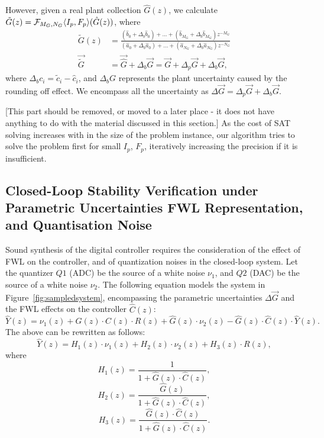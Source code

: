 \documentclass[final]{sig-alternate-05-2015}
\newcommand{\red}[1]{{\color{red}#1}}
\begin{document}
However, given a real plant collection $\hat{G}(z)$,
%
we calculate $\tilde G(z)=\mathcal{F}_{M_G,N_G}\langle{I_p},{F_p}\rangle(\hat{G}(z))$, where 
%
\begin{align}
\label{digital_plant_tf}
\tilde G(z)&=\frac{(\hat{b}_{0}+\Delta_b \hat{b}_{0}) +...+(\hat{b}_{M_G}+\Delta_b \hat{b}_{M_G})z^{-M_G}}{(\hat{a}_{0}+\Delta_b \hat{a}_{0})+...+(\hat{a}_{N_G}+\Delta_b \hat{a}_{N_G})z^{-N_G}} \nonumber \\
\vec{\tilde G} &=\vec{\hat{G}}+\Delta_b{\vec{G}}=\vec{G}+\Delta_p{\vec{G}}+\Delta_b{\vec{G}}, 
\end{align}
%
where $\Delta_bc_i=\tilde{c}_i-\hat{c}_i$, 
and $\Delta_b{G}$ represents the plant uncertainty caused by
the rounding off effect.  We encompass all the uncertainty as
$\Delta{\vec{G}}=\Delta_p{\vec{G}}+\Delta_b{\vec{G}}$. 

\red{[This part should be removed, or moved to a later place - it does not have anything to do with the material discussed in this section.]
As the cost of SAT solving increases with in the size of the problem
instance, our algorithm tries to solve the problem first for small $I_p$,
$F_p$, iteratively increasing the precision if it is insufficient.
}

\subsection{Closed-Loop Stability Verification under Parametric Uncertainties FWL Representation, and Quantisation Noise}
\label{sec:stability}

Sound synthesis of the digital controller requires the consideration of the effect of FWL on the controller, 
and of quantization noises in the closed-loop system.  
Let the quantizer $Q1$ (ADC) be the source of a white noise $\nu_{1}$, 
and $Q2$ (DAC) be the source of a white noise $\nu_{2}$.  The following equation
models the system in Figure~\ref{fig:sampledsystem}, encompassing the
parametric uncertainties $\Delta \vec{G}$ and the FWL effects on
the controller $\hat{C}(z)$:
%
\begin{equation}
\hat{Y}(z)=\nu_{1}(z)+\hat{G}(z)\cdot C(z)\cdot R(z)+\hat{G}(z)\cdot\nu_{2}(z)-\hat{G}(z)\cdot \hat{C}(z)\cdot \hat{Y}(z). 
\end{equation}
%
The above can be rewritten as follows:
%
\begin{equation}
\label{eq:outputfunctions}
\hat{Y}(z)=H_{1}(z)\cdot\nu_{1}(z)+H_{2}(z)\cdot\nu_{2}(z)+H_{3}(z)\cdot R(z),
\end{equation}
%
where
%
\begin{equation*}
H_{1}(z)=\frac{1}{1+\hat{G}(z)\cdot \hat{C}(z)}, 
\end{equation*}
%
\begin{equation*}
H_{2}(z)=\frac{\hat{G}(z)}{1+\hat{G}(z)\cdot \hat{C}(z)}, 
\end{equation*}
%
\begin{equation*}
H_{3}(z)=\frac{\hat{G}(z)\cdot \hat{C}(z)}{1+\hat{G}(z)\cdot \hat{C}(z)}. 
\end{equation*}
\end{document}
